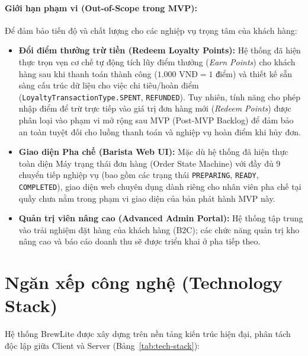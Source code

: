 \paragraph{Giới hạn phạm vi (Out-of-Scope trong MVP):}
Để đảm bảo tiến độ và chất lượng cho các nghiệp vụ trọng tâm của khách hàng:
\begin{itemize}
    \item \textbf{Đổi điểm thưởng trừ tiền (Redeem Loyalty Points):} Hệ thống đã hiện thực trọn vẹn cơ chế tự động tích lũy điểm thưởng (\textit{Earn Points}) cho khách hàng sau khi thanh toán thành công (\(1.000 \text{ VNĐ} = 1 \text{ điểm}\)) và thiết kế sẵn sàng cấu trúc dữ liệu cho việc chi tiêu/hoàn điểm (\texttt{LoyaltyTransactionType.SPENT}, \texttt{REFUNDED}). Tuy nhiên, tính năng cho phép nhập điểm để trừ trực tiếp vào giá trị đơn hàng mới (\textit{Redeem Points}) được phân loại vào phạm vi mở rộng sau MVP (Post-MVP Backlog) để đảm bảo an toàn tuyệt đối cho luồng thanh toán và nghiệp vụ hoàn điểm khi hủy đơn.
    \item \textbf{Giao diện Pha chế (Barista Web UI):} Mặc dù hệ thống đã hiện thực toàn diện Máy trạng thái đơn hàng (Order State Machine) với đầy đủ 9 chuyển tiếp nghiệp vụ (bao gồm các trạng thái \texttt{PREPARING}, \texttt{READY}, \texttt{COMPLETED}), giao diện web chuyên dụng dành riêng cho nhân viên pha chế tại quầy chưa nằm trong phạm vi giao diện của bản phát hành MVP này.
    \item \textbf{Quản trị viên nâng cao (Advanced Admin Portal):} Hệ thống tập trung vào trải nghiệm đặt hàng của khách hàng (B2C); các chức năng quản trị kho nâng cao và báo cáo doanh thu sẽ được triển khai ở pha tiếp theo.
\end{itemize}

\section{Ngăn xếp công nghệ (Technology Stack)}
Hệ thống BrewLite được xây dựng trên nền tảng kiến trúc hiện đại, phân tách độc lập giữa Client và Server (Bảng~\ref{tab:tech-stack}):

